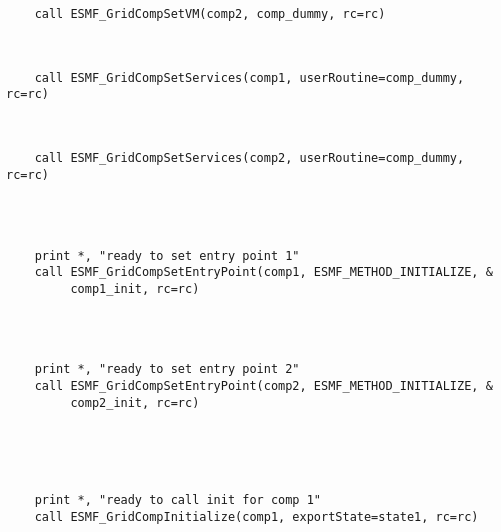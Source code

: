 
 \begin{verbatim}

    call ESMF_GridCompSetVM(comp2, comp_dummy, rc=rc)
 
\end{verbatim}
 

 \begin{verbatim}

    call ESMF_GridCompSetServices(comp1, userRoutine=comp_dummy, rc=rc)
 
\end{verbatim}
 

 \begin{verbatim}

    call ESMF_GridCompSetServices(comp2, userRoutine=comp_dummy, rc=rc)
 
\end{verbatim}
 

 \begin{verbatim}


    print *, "ready to set entry point 1"
    call ESMF_GridCompSetEntryPoint(comp1, ESMF_METHOD_INITIALIZE, &
         comp1_init, rc=rc)
 
\end{verbatim}
 

 \begin{verbatim}


    print *, "ready to set entry point 2"
    call ESMF_GridCompSetEntryPoint(comp2, ESMF_METHOD_INITIALIZE, &
         comp2_init, rc=rc)
 
\end{verbatim}
 

 \begin{verbatim}



    print *, "ready to call init for comp 1"
    call ESMF_GridCompInitialize(comp1, exportState=state1, rc=rc)
 
\end{verbatim}
 
